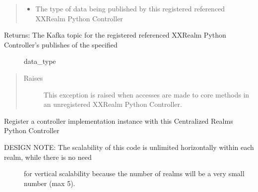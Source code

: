 \documentclass[letterpaper,10pt,english]{sphinxmanual}
\begin{document}
\begin{fulllineitems}
\begin{fulllineitems}
\begin{quote}
\begin{description}
\begin{itemize}
\item {} 
\sphinxAtStartPar
{} \textendash{} The type of data being published by this registered referenced XXRealm Python Controller

\end{itemize}

\end{description}\end{quote}
\begin{description}
\item[{Returns: The Kafka topic for the registered referenced XXRealm Python Controller’s publishes of the specified}] \leavevmode
\sphinxAtStartPar
data\_type

\end{description}
\begin{quote}\begin{description}
\item[{Raises}] \leavevmode
\sphinxAtStartPar
{} \textendash{} This exception is raised when accesses are made to core methods
    in an unregistered XXRealm Python Controller.

\end{description}\end{quote}

\end{fulllineitems}


\begin{fulllineitems}
\label{\detokenize{Realms:Realms.Realms.exposed_register}}
\sphinxAtStartPar
Register a controller implementation instance with this Centralized Realms Python Controller
\begin{description}
\item[{DESIGN NOTE: The scalability of this code is unlimited horizontally within each realm, while there is no need}] \leavevmode
\sphinxAtStartPar
for vertical scalability because the number of realms will be a very small number (max 5).


\end{description}
\end{fulllineitems}
\end{fulllineitems}
\end{document}
